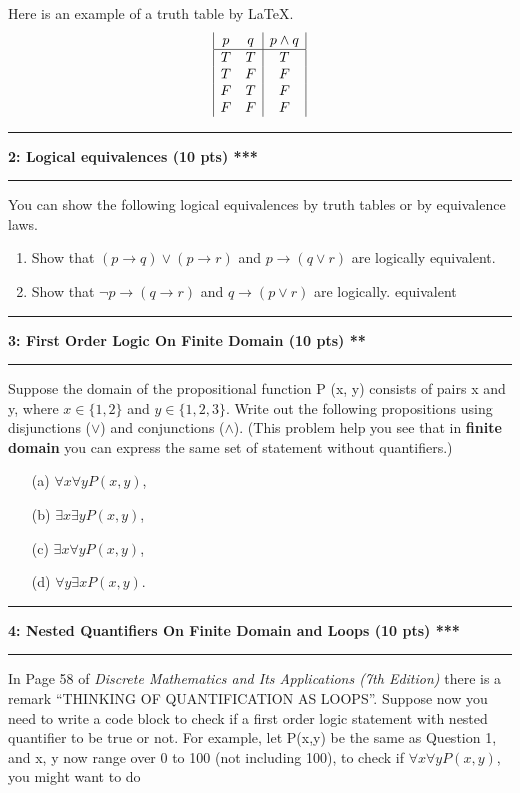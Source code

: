 \documentclass[11pt]{article}
\newcommand\question[2]{\vspace{.25in}\hrule\textbf{#1: #2}\vspace{.5em}\hrule\vspace{.10in}}
\begin{document}
Here is an example of a truth table by \LaTeX.
\begin{displaymath}
\begin{array}{|c c|c|}
p & q & p \land q\\ %
\hline %
T & T & T\\
T & F & F\\
F & T & F\\
F & F & F\\
\end{array}
\end{displaymath}
\question{2}{Logical equivalences (10 pts) ***}
You can show the following logical equivalences by truth tables or by equivalence laws.
\begin{enumerate}
    \item Show that $(p \to q) \lor (p \to r)$ and $p \to (q \lor r)$ are logically equivalent.
    \item Show that $\neg p \to (q \to r)$ and $q \to (p \lor r)$ are logically.
equivalent
\end{enumerate}

\question{3}{First Order Logic On Finite Domain (10 pts) **}
Suppose the domain of the propositional function P (x, y)
consists of pairs x and y, where $x\in \{1,2\}$ and $y\in \{1,2,3\}$. Write out the following propositions using disjunctions ($\lor$)
and conjunctions ($\land$). (This problem help you see that in \textbf{finite domain} you can express the same set of statement without quantifiers.)

\begin{enumerate}
    \item[(a)] $\forall x \forall y P(x,y)$,
    \item[(b)] $\exists x \exists y P(x,y)$,
    \item[(c)] $\exists x \forall y P(x,y)$,
    \item[(d)] $\forall y \exists x P(x,y)$.
\end{enumerate}

\question{4}{Nested Quantifiers On Finite Domain and Loops (10 pts) ***}
In Page 58 of \textit{Discrete Mathematics and Its Applications (7th Edition)}  there is a remark ``THINKING OF QUANTIFICATION AS LOOPS''. Suppose now you need to write a code block to check if a first order logic statement with nested quantifier to be true or not. For example, let P(x,y) be the same as Question 1, and x, y now range over 0 to 100 (not including 100), to check if $\forall x\forall y P(x,y)$, you might want to do
\end{document}
